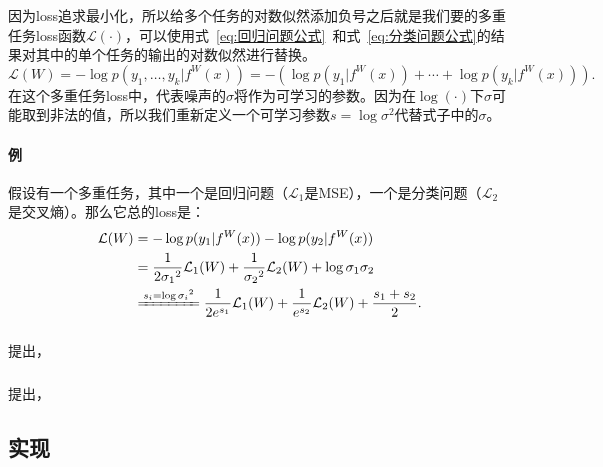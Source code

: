 \documentclass{ctexart}
\begin{document}
因为loss追求最小化，所以给多个任务的对数似然添加负号之后就是我们要的多重任务loss函数$\mathcal{L}(\cdot)$，可以使用式~\ref{eq:回归问题公式}~和式~\ref{eq:分类问题公式}的结果对其中的单个任务的输出的对数似然进行替换。
\begin{equation}
    \mathcal{L}(W) = - \log p(y_1, \ldots, y_k|f^W(x)) = - (\log p(y_1 | f^W(x)) + \cdots + \log p(y_k | f^W(x))).
\end{equation}
在这个多重任务loss中，代表噪声的$\sigma$将作为可学习的参数。因为在$\log(\cdot)$下$\sigma$可能取到非法的值，所以我们重新定义一个可学习参数$s=\log \sigma^2$代替式子中的$\sigma$。

\paragraph{例} 假设有一个多重任务，其中一个是回归问题（$\mathcal{L}_1$是MSE），一个是分类问题（$\mathcal{L}_2$是交叉熵）。那么它总的loss是：
\begin{equation}
    \begin{aligned}
        \mathcal{L}(W) &= - \log p(y_1|f^W(x)) - \log p(y_2|f^W(x)) \\
         &= \frac{1}{2{\sigma_1}^2} \mathcal{L}_1(W) + \frac{1}{{\sigma_2}^2} \mathcal{L}_2(W) + \log \sigma_1\sigma_2 \\
         &\xlongequal{s_i =\log {\sigma_i}^2} \frac{1}{2{e}^{s_1}} \mathcal{L}_1(W) + \frac{1}{{e}^{s_2}} \mathcal{L}_2(W) + \frac{s_1 + s_2}{2}.
    \end{aligned}
\end{equation}

\subsubsection{}

\citet{Chen18GradNorm}提出，

\subsubsection{}

\citet{Sener18Pareto}提出，

\subsection{实现}

\subsubsection{}
\end{document}
